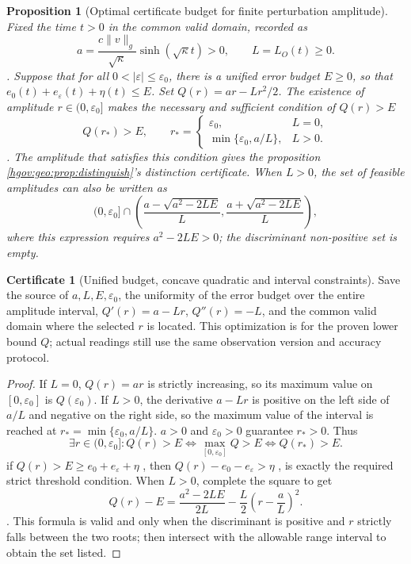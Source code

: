 \documentclass[12pt,a4paper,openany,notitlepage]{report}
\theoremstyle{plain}
\newtheorem{proposition}[theorem]{Proposition}
\theoremstyle{definition}
\newtheorem*{certificate}{Certificate}
\theoremstyle{remark}
\def\mathcal#1{#1}\def\mathsf#1{#1}\def\mathbb#1{#1}%
\begin{document}
\begin{CJK*}
\begin{proposition}
[Optimal certificate budget for finite perturbation amplitude]\label{exp:geo:prop:amplitude-budget}
Fixed the time $t>0$ in the common valid domain, recorded as \[
a=\frac{c\lVert v\rVert_g}{\sqrt\kappa}\sinh(\sqrt\kappa t)>0,
\qquad L=L_{\mathcal O}(t)\ge0.
\]. Suppose that for all $0<|\varepsilon|\le\varepsilon_0$, there is a unified error budget $E\ge0$, so that $e_0(t)+e_\varepsilon(t)+\eta(t)\le E$. Set $Q(r)=ar-Lr^2/2$. The existence of amplitude $r\in(0,\varepsilon_0]$ makes the necessary and sufficient condition of $Q(r)>E$ \[
Q(r_*)>E,\qquad
r_*=
\begin{cases}
\varepsilon_0,&L=0,\\
\min\{\varepsilon_0,a/L\},&L>0.
\end{cases}
\]. The amplitude that satisfies this condition gives the proposition ~ \ref{hgov:geo:prop:distinguish}'s distinction certificate. When $L>0$, the set of feasible amplitudes can also be written as \[
(0,\varepsilon_0]\cap
\left(\frac{a-\sqrt{a^2-2LE}}L,
      \frac{a+\sqrt{a^2-2LE}}L\right),
\] where this expression requires $a^2-2LE>0$; the discriminant non-positive set is empty.\end{proposition}
\begin{certificate}
[Unified budget, concave quadratic and interval constraints]Save the source of $a,L,E,\varepsilon_0$, the uniformity of the error budget over the entire amplitude interval, $Q'(r)=a-Lr$, $Q''(r)=-L$, and the common valid domain where the selected $r$ is located. This optimization is for the proven lower bound $Q$; actual readings still use the same observation version and accuracy protocol.\end{certificate}
\begin{proof}
If $L=0$, $Q(r)=ar$ is strictly increasing, so its maximum value on $[0,\varepsilon_0]$ is $Q(\varepsilon_0)$. If $L>0$, the derivative $a-Lr$ is positive on the left side of $a/L$ and negative on the right side, so the maximum value of the interval is reached at $r_* =\min\{\varepsilon_0,a/L\}$. $a>0$ and $\varepsilon_0>0$ guarantee $r_*>0$. Thus \[
\exists r\in(0,\varepsilon_0]:Q(r)>E
\Longleftrightarrow\max_{[0,\varepsilon_0]}Q>E
\Longleftrightarrow Q(r_*)>E.
\] if $Q(r)>E\ge e_0+e_\varepsilon+\eta$ , then $Q(r)-e_0-e_\varepsilon>\eta$ , is exactly the required strict threshold condition. When $L>0$, complete the square to get \[
Q(r)-E=\frac{a^2-2LE}{2L}
-\frac L2\left(r-\frac aL\right)^2.
\]. This formula is valid and only when the discriminant is positive and $r$ strictly falls between the two roots; then intersect with the allowable range interval to obtain the set listed.\end{proof}



\end{CJK*}
\end{document}
